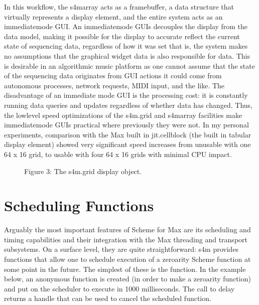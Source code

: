 \documentclass[letterpaper,10pt,english]{sphinxmanual}
\begin{document}
\sphinxAtStartPar
In this workflow, the s4m\sphinxhyphen{}array acts as a framebuffer,
a data structure that virtually represents a display element, and
the entire system acts as an immediate\sphinxhyphen{}mode GUI.
An immediate\sphinxhyphen{}mode GUIs decouples the display from the data model,
making it possible for the display to accurate reflect the current
state of sequencing data, regardless of how it was set
\sphinxhyphen{} that is, the system makes no assumptions that the graphical
widget  data is also responsible for  data.
This is desirable in an algorithmic music platform as one cannot
assume that the state of the sequencing data originates from
GUI actions \sphinxhyphen{} it could come from autonomous processes, network
requests, MIDI input, and the like.
The disadvantage of an immediate mode GUI is the processing cost:
it is constantly running data queries and updates regardless of whether
data has changed.
Thus, the low\sphinxhyphen{}level speed optimizations of the s4m.grid and s4m\sphinxhyphen{}array
facilities make immediate\sphinxhyphen{}mode GUIs practical where previously they were not.
In my personal experiments, comparison with the Max built in jit.cellblock
(the built in tabular display element) showed very significant speed
increases \sphinxhyphen{} from unusable with one 64 x 16 grid, to usable with
four 64 x 16 grids with minimal CPU impact.

\begin{figure}[htbp]
\centering
\capstart

\noindent{}
\caption{Figure 3: The s4m.grid display object.}\label{\detokenize{features_usage:id2}}\end{figure}


\section{Scheduling Functions}
\label{\detokenize{features_usage:scheduling-functions}}
\sphinxAtStartPar
Arguably the most important features of Scheme for Max
are its scheduling and timing capabilities and their integration
with the Max threading and transport subsystems.
On a surface level, they are quite straightforward: s4m provides
functions that allow one to schedule execution of a zero\sphinxhyphen{}arity Scheme
function at some point in the future. The simplest of these is the
 function.
In the example below, an anonymous function is created (in order to make
a zero\sphinxhyphen{}arity function) and put on the scheduler
to execute in 1000 milliseconds. The call to delay returns a
handle that can be used to cancel the scheduled function.
\end{document}
